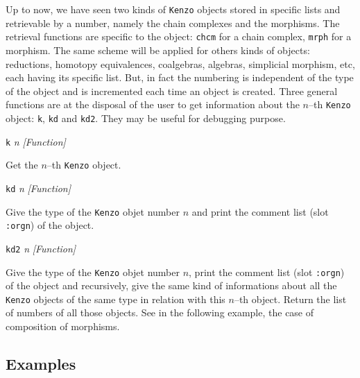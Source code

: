 Up to now, we have seen two kinds of {\tt Kenzo} objects stored in specific lists
and retrievable by a number, namely the chain complexes and the morphisms. The retrieval functions
are specific to the object: {\tt chcm} for a chain complex, {\tt mrph} for a morphism.
The same scheme will be applied for others kinds of objects: reductions, homotopy equivalences, 
coalgebras, algebras, simplicial morphism, etc, each having its specific list. 
But, in fact the numbering is independent
of the type of the object and is incremented each time an object is created. Three general
functions are at the disposal of the user to get information about
the $n$--th {\tt Kenzo} object: {\tt k}, {\tt kd}
and {\tt kd2}. They may be useful for debugging purpose.
\vskip 0.35cm
{\parindent=0mm
{\leftskip=5mm
{\tt k} {\em n} \hfill {\em [Function]} \par}
{\leftskip=15mm
Get the $n$--th {\tt Kenzo} object. \par}
{\leftskip=5mm
{\tt kd} {\em n} \hfill {\em [Function]} \par}
{\leftskip=15mm
Give the type of the {\tt Kenzo} objet number $n$ and print the comment
list (slot {\tt :orgn}) of the object. \par}
{\leftskip=5mm
{\tt kd2} {\em n} \hfill {\em [Function]} \par}
{\leftskip=15mm
Give the type of the {\tt Kenzo} objet number $n$, print the comment
list (slot {\tt :orgn}) of the object and recursively, give the same kind of informations
about all the {\tt Kenzo} objects of the same type in relation with this $n$--th object.
Return the list of numbers of all those objects.
See in the following example, the case of composition of morphisms. \par}
}

\subsection* {Examples}

